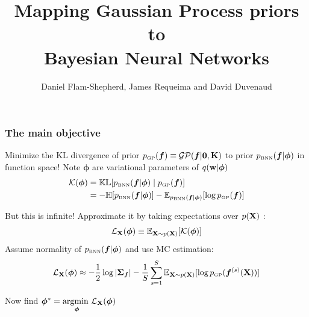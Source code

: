 \documentclass[9pt,serif]{beamer}
\begin{document}
\title {\bfseries{\sc Mapping Gaussian Process priors to\\ Bayesian Neural Networks }}
\author{Daniel Flam-Shepherd, James Requeima and David Duvenaud}
\date{ }

\begin{frame}
\titlepage
\end{frame}

\begin{frame}
\frametitle{The main objective }

Minimize the KL divergence of prior $p_{\text{\tiny GP}} (\bm f ) \equiv \mathcal {G} \mathcal {P} (\bm f  | \bm 0,  \mathbf{K}  )$ to prior $p_{\text{\tiny BNN}} (\bm f |  \bm \phi ) $ 
in function space! Note $\bm \phi$ are variational parameters of $ q( \mathbf{w}  | \bm \phi)$
\begin{align}
    \mathcal K (\bm \phi)&= 
    \mathbb{K}\mathbb{L} [p_{\text{\tiny BNN}} (\bm f |  \bm \phi ) \mid   p_{\text{\tiny GP}} (\bm f )] \\
    &= -\mathbb{H} [p_{\text{\tiny BNN}} (\bm f |  \bm \phi ) ] 
       - \mathbb{E}_{p_{\text{\tiny BNN}} (\bm f |  \bm \phi ) } [\log p_{\text{\tiny GP}} (\bm f  ) ]    
\end{align}

But this is infinite! Approximate it by taking expectations over $p( \mathbf{X} )$ :
$$ \mathcal{L} _{ \mathbf{X} } (\bm \phi) \equiv \mathbb{E} _{ \mathbf{X}  \sim p( \mathbf{X} )} [ \mathcal K (\bm \phi) ] $$  
Assume normality of $p_{\text{\tiny BNN}} (\bm f |  \bm \phi )$ and use MC estimation:  
\begin{align}
     \mathcal{L} _{ \mathbf{X} } (\bm \phi) \approx
  -\frac{1}{2} \log |\bm \Sigma _{\bm f}| -
  \frac{1}{S} \sum_{s=1}^S \mathbb{E} _{ \mathbf{X}  \sim p( \mathbf{X} )} [\log p_{\text{\tiny GP}} (\bm f ^{(s)}( \mathbf{X} ) ) ]
\end{align}

Now find $ \bm \phi ^* =  \underset{\bm \phi}{\text{argmin }}  \mathcal{L} _{ \mathbf{X} } (\bm \phi ) $ 


\end{frame}

\end{document}
